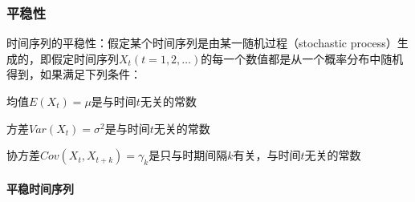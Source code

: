 \documentclass[12pt]{book}
\begin{document}
\subsubsection{平稳性}







时间序列的平稳性：假定某个时间序列是由某一随机过程（stochastic process）生成的，即假定时间序列${X_t}(t=1,2,…)$的每一个数值都是从一个概率分布中随机得到，如果满足下列条件：

\par 均值$E(X_t)=\mu$是与时间$t$无关的常数  
\par 方差$Var\left(X_t\right)=\sigma^2$是与时间$t$无关的常数  
\par 协方差$Cov\left(X_t,X_{t+k}\right)=\gamma_k$是只与时期间隔$k$有关，与时间$t$无关的常数

\paragraph{平稳时间序列}
\end{document}
